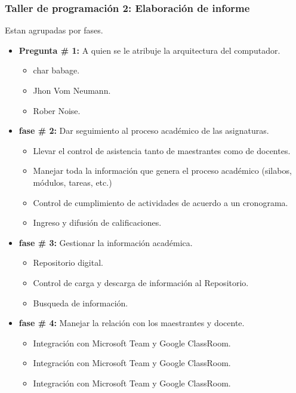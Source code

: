 \documentclass[a4paper,12pt,spanish]{article}
\begin{document}
\vfill

\subsubsection{Taller de programación 2: Elaboración de informe}
\label{sec:tall-de-progr-1}

\vfill

\begin{tcolorbox}[skin=widget,
boxrule=1mm,
coltitle=black,
colframe=blue!45!white,colback=blue!15!white,width=(1\linewidth),before=\hfill,after=\hfill,adjusted title={\textbf{Preguntas para el autocontrol}}]
Estan agrupadas por fases.  
\tcblower

\begin{itemize}
\item \textbf{Pregunta \# 1:} A quien se le atribuje la arquitectura del computador.
  \begin{itemize}
  \item  char babage.
  \item Jhon Vom Neumann.
  \item Rober Noise.
  \end{itemize}
\item \textbf{fase \# 2:} Dar seguimiento al proceso académico de las asignaturas.
  \begin{itemize}
  \item Llevar el control de asistencia tanto de maestrantes como de docentes.
  \item Manejar toda la información que genera el proceso académico (silabos, módulos, tareas, etc.)
  \item Control de cumplimiento de actividades de acuerdo a un cronograma.
  \item Ingreso y difusión de calificaciones.
  \end{itemize}
\item \textbf{fase \# 3:} Gestionar la información académica.
  \begin{itemize}
  \item Repositorio digital.
  \item Control de carga y descarga de información al Repositorio.
  \item Busqueda de información. 
  \end{itemize}
\item \textbf{fase \# 4:} Manejar la relación con los maestrantes y docente.
  \begin{itemize}
  \item Integración con Microsoft Team y Google ClassRoom.
  \item Integración con Microsoft Team y Google ClassRoom.
  \item Integración con Microsoft Team y Google ClassRoom.
  \end{itemize}
\end{itemize}

\end{tcolorbox}
\end{document}
